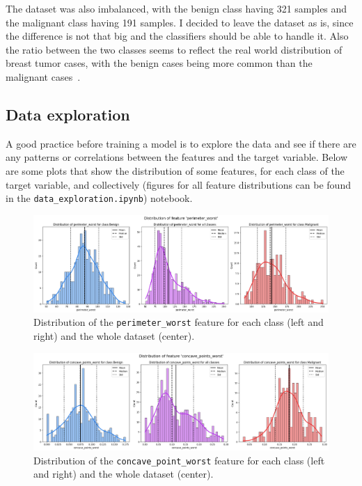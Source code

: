 \documentclass[12pt]{article}
\begin{document}
The dataset was also imbalanced, with the benign class having 321 samples and
the malignant class having 191 samples. I decided to leave the dataset as is,
since the difference is not that big and the classifiers should be able to
handle it. Also the ratio between the two classes seems to reflect the real
world distribution of breast tumor cases, with the benign cases being more
common than the malignant cases~\cite{%
Ugiagbe_Olu-Eddo_2011,Bhathal_Brown_Lesueur_Russell_1985}.


\subsection{Data exploration}

A good practice before training a model is to explore the data and see if there
are any patterns or correlations between the features and the target variable.
Below are some plots that show the distribution of some features, for each class
of the target variable, and collectively (figures for all feature distributions
can be found in the \texttt{data\_exploration.ipynb}) notebook.

\begin{figure}[H]
    \centering
    \includegraphics[width=\textwidth]{ims/perimeter_worst.png}
    \caption{Distribution of the \texttt{perimeter\_worst} feature for each
    class (left and right) and the whole dataset (center).}
    \label{fig:perimeter_worst}
\end{figure}

\begin{figure}[H]
    \centering
    \includegraphics[width=\textwidth]{ims/concave_points_worst.png}
    \caption{Distribution of the \texttt{concave\_point\_worst} feature for each
    class (left and right) and the whole dataset (center).}
    \label{fig:area_worst}
\end{figure}
\end{document}

